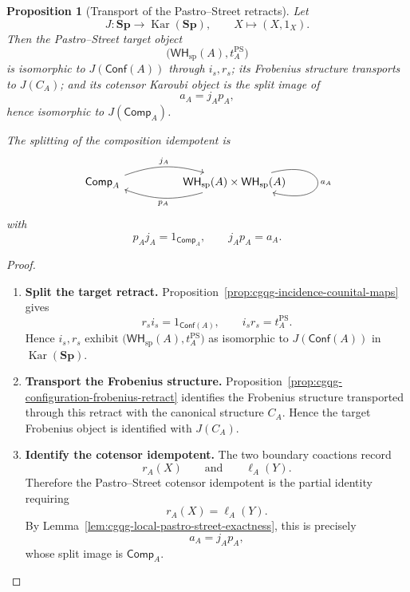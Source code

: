 \documentclass[oneside]{article}
\newcommand{\Conf}{\mathsf{Conf}}
\newcommand{\WH}{\mathsf{WH}}
\newcommand{\Sp}{\mathbf{Sp}}
\newcommand{\Kar}{\operatorname{Kar}}
\theoremstyle{plain}
\newtheorem{proposition}[theorem]{Proposition}
\theoremstyle{definition}
\theoremstyle{remark}
\begin{document}
\begin{proposition}[Transport of the Pastro--Street retracts]
\label{prop:cgqg-ps-karoubi-transport}
    Let
    \[
        J:\Sp\longrightarrow\Kar(\Sp),
        \qquad
        X\longmapsto(X,1_X).
    \]
    Then the Pastro--Street target object
    \[
        \bigl(\WH_{\mathrm{sp}}(A),t_A^{\mathrm{PS}}\bigr)
    \]
    is isomorphic to \(J(\Conf(A))\) through \(i_s,r_s\); its Frobenius structure transports to \(J(C_A)\); and its cotensor Karoubi object is the split image of
    \[
        a_A=j_Ap_A,
    \]
    hence isomorphic to \(J(\mathsf{Comp}_A)\).

    The splitting of the composition idempotent is
    \begin{equation*}
        \begin{tikzcd}[column sep=huge]
            \mathsf{Comp}_A
                \arrow[r,bend left=18,"j_A"]
            &
            \WH_{\mathrm{sp}}(A)\times\WH_{\mathrm{sp}}(A)
                \arrow[l,bend left=18,"p_A"]
                \arrow[loop right,"a_A"]
        \end{tikzcd}
    \end{equation*}
    with
    \[
        p_Aj_A=1_{\mathsf{Comp}_A},
        \qquad
        j_Ap_A=a_A.
    \]
\end{proposition}
\begin{proof}
    \leavevmode
    \begin{enumerate}[beginpenalty=10000]
        \item \textbf{Split the target retract.} Proposition~\ref{prop:cgqg-incidence-counital-maps} gives
        \[
            r_si_s=1_{\Conf(A)},
            \qquad
            i_sr_s=t_A^{\mathrm{PS}}.
        \]
        Hence \(i_s,r_s\) exhibit \(\bigl(\WH_{\mathrm{sp}}(A),t_A^{\mathrm{PS}}\bigr)\) as isomorphic to \(J(\Conf(A))\) in \(\Kar(\Sp)\).

        \item \textbf{Transport the Frobenius structure.} Proposition~\ref{prop:cgqg-configuration-frobenius-retract} identifies the Frobenius structure transported through this retract with the canonical structure \(C_A\). Hence the target Frobenius object is identified with \(J(C_A)\).

        \item \textbf{Identify the cotensor idempotent.} The two boundary coactions record
        \[
            r_A(X)
            \qquad\text{and}\qquad
            \ell_A(Y).
        \]
        Therefore the Pastro--Street cotensor idempotent is the partial identity requiring
        \[
            r_A(X)=\ell_A(Y).
        \]
        By Lemma~\ref{lem:cgqg-local-pastro-street-exactness}, this is precisely
        \[
            a_A=j_Ap_A,
        \]
        whose split image is \(\mathsf{Comp}_A\). \qedhere
    \end{enumerate}
\end{proof}
\end{document}
